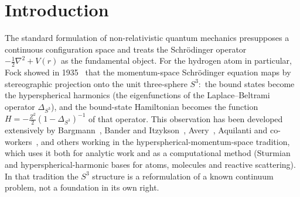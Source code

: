 \documentclass[aps,pra,twocolumn,superscriptaddress,longbibliography]{revtex4-2}
\begin{document}
\begin{abstract}
linked by an exact Peter--Weyl label identification, with Fock's
conformal projection linking the operator to the Schr\"odinger equation
(the bound-state Hamiltonian is $H = -\tfrac{Z^2}{2}(1-\Delta_{S^3})^{-1}$),
and the interpretive question of
which description is more fundamental is left open.  The framework's
concrete computational advantages---$O(V)$ sparsity, angular momentum
selection rules baked into the basis, bit-exactly rational squared
matrix elements on the Bargmann--Segal lattice, and the universal sparsity
bound---are independent of that interpretive question. (The integer
spectrum $n^2 - 1$ is a property of the continuum operator, not of the
graph, whose closed-form spectrum is bounded in $[0, 8]$.)
\end{abstract}

\maketitle

\section{Introduction}
\label{sec:intro}

The standard formulation of non-relativistic quantum mechanics
presupposes a continuous configuration space and treats the
Schr\"odinger operator $-\tfrac{1}{2}\nabla^2 + V(r)$ as the
fundamental object.  For the hydrogen atom in particular, Fock showed
in 1935~\cite{fock1935} that the momentum-space Schr\"odinger equation
maps by stereographic projection onto the unit three-sphere $S^3$:\ the
bound states become the hyperspherical harmonics (the eigenfunctions of
the Laplace--Beltrami operator $\Delta_{S^3}$), and the bound-state
Hamiltonian becomes the function $H = -\tfrac{Z^2}{2}(1-\Delta_{S^3})^{-1}$ of that operator.  This observation has been developed extensively
by Bargmann~\cite{bargmann1936}, Bander and Itzykson~\cite{bander_itzykson1966},
Avery~\cite{avery_book1989}, Aquilanti and
co-workers~\cite{aquilanti_caligiana2002}, and others working in the
hyperspherical-momentum-space tradition, which uses it both for
analytic work and as a computational method (Sturmian and
hyperspherical-harmonic bases for atoms, molecules and reactive
scattering).  In that tradition the $S^3$ structure is a reformulation
of a known continuum problem, not a foundation in its own right.
\end{document}
